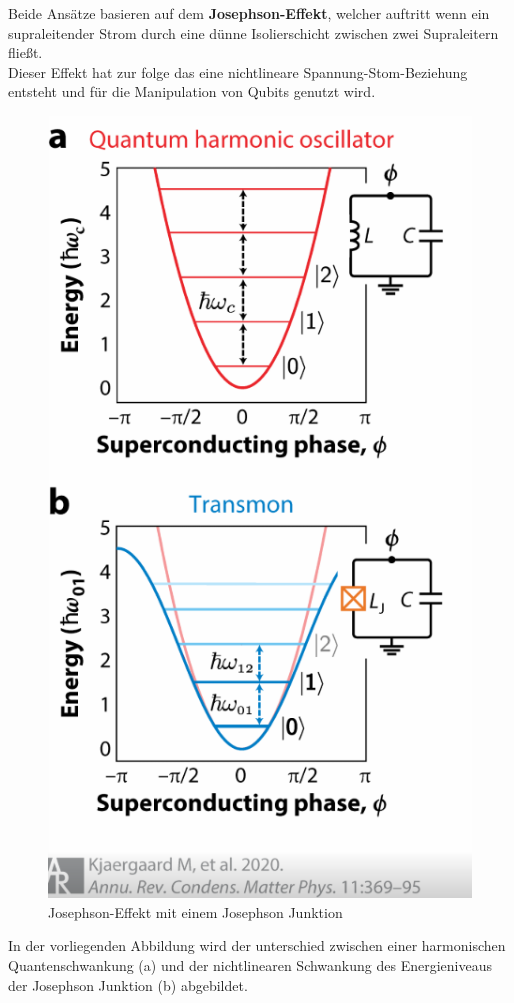 Beide Ansätze basieren auf dem \textbf{Josephson-Effekt}, welcher auftritt wenn ein supraleitender Strom durch eine dünne Isolierschicht zwischen zwei Supraleitern fließt.\\
Dieser Effekt hat zur folge das eine nichtlineare Spannung-Stom-Beziehung entsteht und für die Manipulation von Qubits genutzt wird.\\

\begin{figure}[H]
    \centering
    \includegraphics[width=0.75\linewidth]{img/JJ.png}
    \caption{Josephson-Effekt mit einem Josephson Junktion}
    \label{fig:Josephson-junktion}
\end{figure}

In der vorliegenden Abbildung wird der unterschied zwischen einer harmonischen Quantenschwankung (a) und der nichtlinearen Schwankung des Energieniveaus der Josephson Junktion (b) abgebildet.\\

